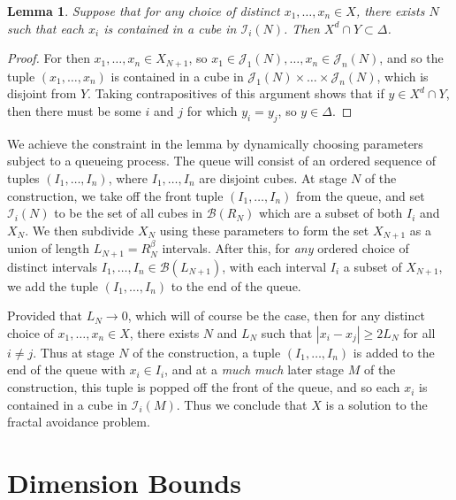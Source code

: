 \documentclass{article}
\theoremstyle{plain}
\newtheorem{lemma}{Lemma}
\theoremstyle{plain}
\begin{document}
\begin{multicols}{2}
\begin{lemma}
	Suppose that for any choice of distinct $x_1, \dots, x_n \in X$, there exists $N$ such that each $x_i$ is contained in a cube in $\mathcal{I}_i(N)$. Then $X^d \cap Y \subset \Delta$.
\end{lemma}
\begin{proof}
	For then $x_1, \dots, x_n \in X_{N+1}$, so $x_1 \in \mathcal{J}_1(N), \dots, x_n \in \mathcal{J}_n(N)$, and so the tuple $(x_1, \dots, x_n)$ is contained in a cube in $\mathcal{J}_1(N) \times \dots \times \mathcal{J}_n(N)$, which is disjoint from $Y$. Taking contrapositives of this argument shows that if $y \in X^d \cap Y$, then there must be some $i$ and $j$ for which $y_i = y_j$, so $y \in \Delta$.
\end{proof}


We achieve the constraint in the lemma by dynamically choosing parameters subject to a queueing process. The queue will consist of an ordered sequence of tuples $(I_1, \dots, I_n)$, where $I_1 ,\dots, I_n$ are disjoint cubes. At stage $N$ of the construction, we take off the front tuple $(I_1, \dots, I_n)$ from the queue, and set $\mathcal{I}_i(N)$ to be the set of all cubes in $\mathcal{B}(R_N)$ which are a subset of both $I_i$ and $X_N$. We then subdivide $X_N$ using these parameters to form the set $X_{N+1}$ as a union of length $L_{N+1} = R_N^\beta$ intervals. After this, for {\it any} ordered choice of distinct intervals $I_1, \dots, I_n \in \mathcal{B}(L_{N+1})$, with each interval $I_i$ a subset of $X_{N+1}$, we add the tuple $(I_1, \dots, I_n)$ to the end of the queue.

Provided that $L_N \to 0$, which will of course be the case, then for any distinct choice of $x_1, \dots, x_n \in X$, there exists $N$ and $L_N$ such that $|x_i - x_j| \geq 2 L_N$ for all $i \neq j$. Thus at stage $N$ of the construction, a tuple $(I_1, \dots, I_n)$ is added to the end of the queue with $x_i \in I_i$, and at a {\it much} {\it much} later stage $M$ of the construction, this tuple is popped off the front of the queue, and so each $x_i$ is contained in a cube in $\mathcal{I}_i(M)$. Thus we conclude that $X$ is a solution to the fractal avoidance problem.

\section{Dimension Bounds}


\end{multicols}
\end{document}
